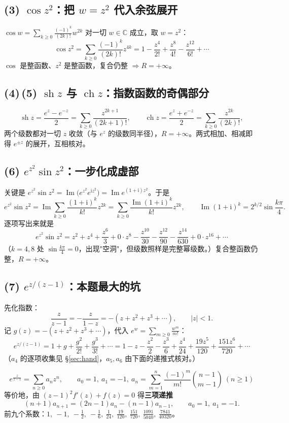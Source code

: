 \documentclass[11pt,a4paper]{ctexart}
\theoremstyle{definition}
\DeclareMathOperator{\Imag}{Im}
\providecommand{\sh}{\operatorname{sh}}
\providecommand{\ch}{\operatorname{ch}}
\newcommand{\ii}{\mathrm{i}}
\begin{document}
\subsection{(3) $\cos z^2$：把 $w=z^2$ 代入余弦展开}
$\cos w=\sum_{k\ge0}\frac{(-1)^k}{(2k)!}w^{2k}$ 对一切 $w\in\mathbb{C}$ 成立，取 $w=z^2$：
\[
\cos z^2=\sum_{k\ge0}\frac{(-1)^k}{(2k)!}z^{4k}=1-\frac{z^4}{2!}+\frac{z^8}{4!}-\frac{z^{12}}{6!}+\cdots
\]
$\cos$ 是整函数、$z^2$ 是整函数，复合仍整 $\Rightarrow R=+\infty$。

\subsection{(4)\,(5) $\sh z$ 与 $\ch z$：指数函数的奇偶部分}
\[
\sh z=\frac{e^{z}-e^{-z}}2=\sum_{k\ge0}\frac{z^{2k+1}}{(2k+1)!},
\qquad
\ch z=\frac{e^{z}+e^{-z}}2=\sum_{k\ge0}\frac{z^{2k}}{(2k)!},
\]
两个级数都对一切 $z$ 收敛（与 $e^z$ 的级数同半径），$R=+\infty$。两式相加、相减即得 $e^{\pm z}$ 的展开，互相核对。

\subsection{(6) $e^{z^2}\sin z^2$：一步化成虚部}
关键是 $e^{z^2}\sin z^2=\Imag\bigl(e^{z^2}e^{\ii z^2}\bigr)=\Imag e^{(1+\ii)z^2}$。于是
\[
e^{z^2}\sin z^2=\Imag\sum_{k\ge0}\frac{(1+\ii)^k}{k!}z^{2k}
=\sum_{k\ge0}\frac{\Imag(1+\ii)^k}{k!}z^{2k},\qquad \Imag(1+\ii)^k=2^{k/2}\sin\frac{k\pi}{4}.
\]
逐项写出来就是
\[
e^{z^2}\sin z^2=z^2+z^4+\frac{z^6}{3}+0\cdot z^8-\frac{z^{10}}{30}-\frac{z^{12}}{90}-\frac{z^{14}}{630}+0\cdot z^{16}+\cdots
\]
（$k=4,8$ 处 $\sin\frac{k\pi}{4}=0$，出现"空洞"，但级数照样是完整幂级数。）复合整函数仍整，$R=+\infty$。

\subsection{(7) $e^{z/(z-1)}$：本题最大的坑}\label{sec:q7}
先化指数：
\[
\frac{z}{z-1}=-\frac{z}{1-z}=-(z+z^2+z^3+\cdots),\qquad |z|<1 .
\]
记 $g(z)=-(z+z^2+z^3+\cdots)$，代入 $e^{w}=\sum_{m\ge0}\frac{w^m}{m!}$：
\[
e^{z/(z-1)}=1+g+\frac{g^2}{2!}+\frac{g^3}{3!}+\cdots
=1-z-\frac{z^2}{2}-\frac{z^3}{6}+\frac{z^4}{24}+\frac{19z^5}{120}+\frac{151z^6}{720}+\cdots
\]
（$a_4$ 的逐项收集见 \S\ref{sec:hand}，$a_5,a_6$ 由下面的递推式核对。）

\begin{keybox}[结果与递推]
\[
\boxed{\;e^{\frac{z}{z-1}}=\sum_{n\ge0}a_nz^n,\qquad a_0=1,\ a_1=-1,\
a_n=\sum_{m=1}^{n}\frac{(-1)^m}{m!}\binom{n-1}{m-1}\ (n\ge1)\;}
\]
等价地，由 $(z-1)^2f'(z)+f(z)=0$ 得\textbf{三项递推}
\[
(n+1)a_{n+1}=(2n-1)a_n-(n-1)a_{n-1},\qquad a_0=1,\ a_1=-1 .
\]
前九个系数：$1,\ -1,\ -\tfrac12,\ -\tfrac16,\ \tfrac1{24},\ \tfrac{19}{120},\ \tfrac{151}{720},\ \tfrac{1091}{5040},\ \tfrac{7841}{40320}$。
\end{keybox}
\end{document}
